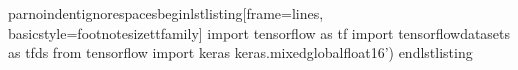 \markdownRendererDocumentBegin
\markdownRendererBackslash{}par\markdownRendererBackslash{}noindent\markdownRendererBackslash{}ignorespaces\markdownRendererBackslash{}begin\markdownRendererLeftBrace{}lstlisting\markdownRendererRightBrace{}[frame=lines, basicstyle=\markdownRendererBackslash{}footnotesize\markdownRendererBackslash{}ttfamily] import tensorflow as tf import tensorflow\markdownRendererUnderscore{}datasets as tfds\markdownRendererInterblockSeparator
{}from tensorflow import keras\markdownRendererInterblockSeparator
{}\markdownRendererSectionBegin
{}\markdownRendererInterblockSeparator
{}keras.mixedglobalfloat16') \markdownRendererBackslash{}end\markdownRendererLeftBrace{}lstlisting\markdownRendererRightBrace{}
\markdownRendererSectionEnd \markdownRendererDocumentEnd